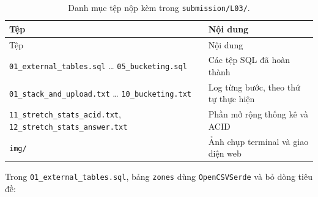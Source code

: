 \documentclass[
  12pt,
  a4paper,
]{article}
\begin{document}
\begin{longtable}[]{@{}
  >{\raggedright\arraybackslash}p{}
  >{\raggedright\arraybackslash}p{}@{}}
\caption{\label{tbl:l03-files}Danh mục tệp nộp kèm trong
\texttt{submission/L03/}.}\tabularnewline
\toprule\noalign{}
\begin{minipage}[b]{\linewidth}\raggedright
Tệp
\end{minipage} & \begin{minipage}[b]{\linewidth}\raggedright
Nội dung
\end{minipage} \\
\midrule\noalign{}
\endfirsthead
\toprule\noalign{}
\begin{minipage}[b]{\linewidth}\raggedright
Tệp
\end{minipage} & \begin{minipage}[b]{\linewidth}\raggedright
Nội dung
\end{minipage} \\
\midrule\noalign{}
\endhead
\bottomrule\noalign{}
\endlastfoot
\texttt{01\_}\allowbreak{}\texttt{external\_}\allowbreak{}\texttt{tables.}\allowbreak{}\texttt{sql}\allowbreak{}
\ldots{}
\texttt{05\_}\allowbreak{}\texttt{bucketing.}\allowbreak{}\texttt{sql}\allowbreak{}
& Các tệp SQL đã hoàn thành \\
\texttt{01\_}\allowbreak{}\texttt{stack\_}\allowbreak{}\texttt{and\_}\allowbreak{}\texttt{upload.}\allowbreak{}\texttt{txt}\allowbreak{}
\ldots{}
\texttt{10\_}\allowbreak{}\texttt{bucketing.}\allowbreak{}\texttt{txt}\allowbreak{}
& Log từng bước, theo thứ tự thực hiện \\
\texttt{11\_}\allowbreak{}\texttt{stretch\_}\allowbreak{}\texttt{stats\_}\allowbreak{}\texttt{acid.}\allowbreak{}\texttt{txt}\allowbreak{},
\texttt{12\_}\allowbreak{}\texttt{stretch\_}\allowbreak{}\texttt{stats\_}\allowbreak{}\texttt{answer.}\allowbreak{}\texttt{txt}\allowbreak{}
& Phần mở rộng thống kê và ACID \\
\texttt{img/} & Ảnh chụp terminal và giao diện web \\
\end{longtable}

Trong
\texttt{01\_}\allowbreak{}\texttt{external\_}\allowbreak{}\texttt{tables.}\allowbreak{}\texttt{sql}\allowbreak{},
bảng \texttt{zones} dùng \texttt{OpenCSVSerde} và bỏ dòng tiêu đề:
\end{document}
